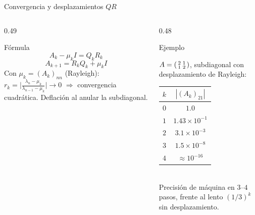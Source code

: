 \documentclass[aspectratio=169,10pt]{beamer}
\begin{document}
\begin{frame}{Convergencia y desplazamientos $QR$}
\begin{columns}[T]
\begin{column}{0.49\textwidth}
\begin{cardidea}{Fórmula}{\faSuperscript}
$$A_k-\mu_k I=Q_kR_k$$
$$A_{k+1}=R_kQ_k+\mu_k I$$
{\footnotesize Con $\mu_k=(A_k)_{nn}$ (Rayleigh): $r_k=\big|\tfrac{\lambda_n-\mu_k}{\lambda_{n-1}-\mu_k}\big|\to0$ $\Rightarrow$ convergencia cuadrática. Deflación al anular la subdiagonal.}
\end{cardidea}
\end{column}
\begin{column}{0.48\textwidth}
\begin{cardgear}{Ejemplo}{\faCalculator}
\centering
{\footnotesize $A=\begin{psmallmatrix}2&1\\1&2\end{psmallmatrix}$, subdiagonal con desplazamiento de Rayleigh:\\[1mm]
\renewcommand{\arraystretch}{1.25}
\begin{tabular}{c|c}
$k$ & $|(A_k)_{21}|$\\\hline
$0$&$1.0$\\ $1$&$1.43\times10^{-1}$\\ $2$&$3.1\times10^{-3}$\\ $3$&$1.5\times10^{-8}$\\ $4$&$\approx10^{-16}$\\
\end{tabular}}\\[1mm]
{\footnotesize Precisión de máquina en $3$–$4$ pasos, frente al lento $(1/3)^k$ sin desplazamiento.}
\end{cardgear}
\end{column}
\end{columns}
\end{frame}
\end{document}
